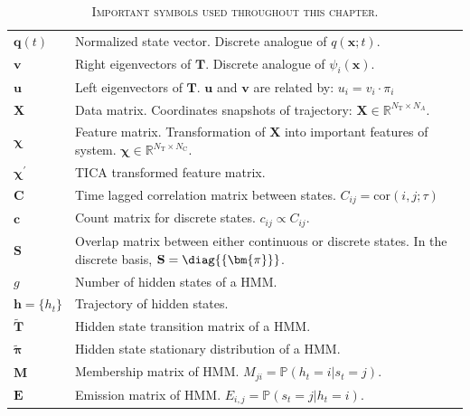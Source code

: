 \begin{table}
\begin{tabularx}{0.9\textwidth}{ |l| >{\raggedright\arraybackslash}X | }
        $\mathbf{q}(t)$ & Normalized state vector. Discrete analogue of $q(\mathbf{x};t)$. \\
        $\mathbf{v}$ & Right eigenvectors of $\mathbf{T}$. Discrete analogue of $\psi_{i}(\mathbf{x})$. \\
        $\mathbf{u}$ & Left eigenvectors of $\mathbf{T}$. $\mathbf{u}$ and $\mathbf{v}$ are related by: $u_{i} = v_{i}\cdot\pi_{i}$ \\
        $\mathbf{X}$ & Data matrix.  Coordinates snapshots of trajectory: $\mathbf{X}\in \mathbb{R}^{N_{\mathrm{T}}\times N_{A}}$.\\
        $\bm{\chi}$ & Feature matrix. Transformation of $\mathbf{X}$ into important features of system. $\bm{\chi} \in \mathbb{R}^{N_{\mathrm{T}}\times N_{\mathrm{C}}}$. \\
        $\bm{\chi}^{\prime}$ & TICA transformed feature matrix. \\
        $\mathbf{C}$ & Time lagged correlation matrix between states. $C_{ij} = \mathrm{cor}(i, j; \tau)$  \\
        $\mathbf{c}$ & Count matrix for discrete states. $c_{ij} \propto C_{ij}$. \\
        $\mathbf{S}$ & Overlap matrix between  either continuous or discrete states. In the discrete basis, $\mathbf{S} = \diag{\{\bm{\pi}\}}$. \\
        $g$ & Number of hidden states of a HMM. \\
        $\mathbf{h} = \{h_t\}$ & Trajectory of hidden states. \\
        $\widetilde{\mathbf{T}}$ & Hidden state transition matrix of a HMM. \\
        $\widetilde{\bm{\pi}}$ & Hidden state stationary distribution of a HMM. \\
        $\mathbf{M}$ & Membership matrix of HMM. $M_{ji} = \mathbb{P}(h_t=i|s_t=j)$. \\
        $\mathbf{E}$ & Emission matrix of HMM. $E_{i, j}= \mathbb{P}(s_t=j|h_t=i)$. \\
     \hline
     \end{tabularx}
    \caption[Important symbols]{\textsc{Important symbols used throughout this chapter.}}

    \label{tab:theory_symbols}
\end{table}

